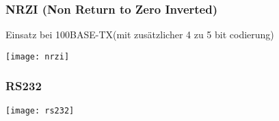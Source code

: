 \subsubsection{NRZI (Non Return to Zero Inverted)}
Einsatz bei 100BASE-TX(mit zusätzlicher 4 zu 5 bit codierung)
\begin{center}
    \texttt{[image: nrzi]}
\end{center}

\subsubsection{RS232}
\begin{center}
    \texttt{[image: rs232]}
\end{center}






